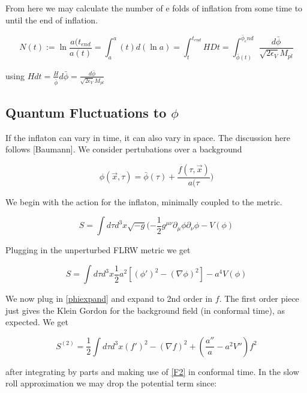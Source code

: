\documentclass[a4paper,11pt]{article}
\newcommand{\Mp}{M_{pl}}
\newcommand{\half}{\frac{1}{2}}
\newcommand{\bphi}{\bar{\phi}}
\begin{document}
From here we may calculate the number of e folds of inflation from some time to until the end of inflation. 

\begin{equation}
N(t) := \ln{\frac{a(t_{end}}{a(t)}} = \int_a^a(t) d(\ln{a}) = \int_t^{t_{end}} HDt = \int_{\bphi(t)}^{\bphi_end} \frac{d\bphi}{\sqrt{2\epsilon_V}\Mp}
\end{equation}

using $Hdt=\frac{H}{\dot{\bphi}}d\bphi=\frac{d\bphi}{\sqrt{2\epsilon_V}\Mp}$

\subsection{Quantum Fluctuations to $\phi$}

If the inflaton can vary in time, it can also vary in space. The discussion here follows [Baumann]. We consider pertubations over a background

\begin{equation}
\phi(\vec{x},\tau) = \bphi(\tau) + \frac{f(\tau, \vec{x})}{a(\tau})
\label{phiexpand}
\end{equation}

We begin with the action for the inflaton, minimally coupled to the metric.

\begin{equation}
S = \int d\tau d^3x \sqrt{-g} (-\half g^{\mu \nu}\partial_\mu \phi\partial_\nu \phi - V(\phi)  
\end{equation}

Plugging in the unperturbed FLRW metric we get 


\begin{equation}
S = \int d\tau d^3x \half a^2 [(\phi ' )^2 -(\nabla \phi)^2]-a^4V(\phi)
\end{equation}

We now plug in \ref{phiexpand} and expand to 2nd order in $f$. The first order piece just gives the Klein Gordon for the background field (in conformal time), as expected. We get

\begin{equation}
S^{(2)} = \half \int d\tau d^3x (f')^2 - (\nabla f)^2 + (\frac{a''}{a}-a^2V'')f^2
\end{equation}

after integrating by parts and making use of \ref{F2} in conformal time. In the slow roll approximation we may drop the potential term since:
\end{document}

